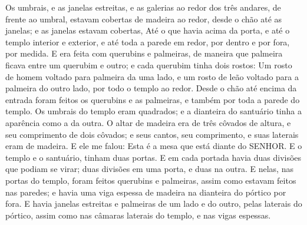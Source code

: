 {Os umbrais, e as janelas estreitas, e as galerias ao redor dos três andares, de frente ao umbral, estavam cobertas de madeira ao redor, desde o chão até as janelas; e as janelas estavam cobertas,
Até o que havia acima da porta, e até o templo interior e exterior, e até toda a parede em redor, por dentro e por fora,
{} por medida.
E era feita com querubins e palmeiras, de maneira que
{} palmeira ficava entre um querubim e outro; e cada querubim tinha dois rostos:
Um rosto de homem voltado para palmeira da uma lado, e um rosto de leão voltado para a palmeira do outro lado,
{} por todo o templo ao redor.
Desde o chão até encima da entrada foram feitos os querubins e as palmeiras, e também por toda a parede do templo.
Os umbrais do templo eram quadrados; e a dianteira do santuário tinha a aparência como a da outra.
O altar de madeira era de três côvados de altura, e seu comprimento de dois côvados; e seus cantos, seu comprimento, e suas laterais eram de madeira. E ele me falou: Esta é a mesa que está diante do SENHOR.
E o templo e o santuário,
{} tinham duas portas.
E em cada portada havia duas divisões que podiam se virar; duas divisões em uma porta, e duas na outra.
E nelas, nas portas do templo, foram feitos querubins e palmeiras, assim como estavam feitos nas paredes; e havia uma viga espessa de madeira na dianteira do pórtico por fora.
E havia janelas estreitas e palmeiras de um lado e do outro, pelas laterais do pórtico, assim como nas câmaras laterais do templo, e nas vigas espessas.

}
